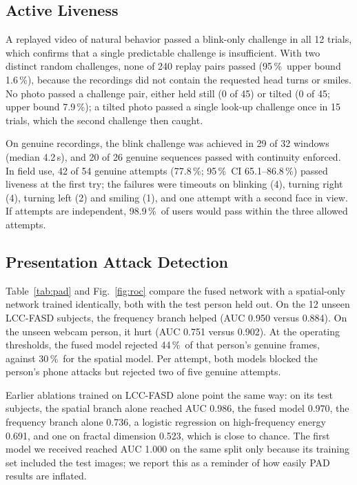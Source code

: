 \documentclass{ieeeaccess}
\newcommand{\pct}{\,\%}
\begin{document}
\subsection{Active Liveness}
\label{sec:res-liveness}
A replayed video of natural behavior passed a blink-only challenge in all 12 trials, which confirms that
a single predictable challenge is insufficient. With two distinct random challenges, none of 240 replay
pairs passed (95\pct\ upper bound 1.6\pct), because the recordings did not contain the requested head
turns or smiles. No photo passed a challenge pair, either held still (0 of 45) or tilted (0 of 45;
upper bound 7.9\pct); a tilted photo passed a single look-up challenge once in 15 trials, which the
second challenge then caught.

On genuine recordings, the blink challenge was achieved in 29 of 32 windows (median 4.2\,s), and 20 of
26 genuine sequences passed with continuity enforced. In field use, 42 of 54 genuine attempts (77.8\pct;
95\pct\ CI 65.1--86.8\pct) passed liveness at the first try; the failures were timeouts on blinking (4),
turning right (4), turning left (2) and smiling (1), and one attempt with a second face in view. If
attempts are independent, 98.9\pct\ of users would pass within the three allowed attempts.

\subsection{Presentation Attack Detection}
\label{sec:res-pad}
Table~\ref{tab:pad} and Fig.~\ref{fig:roc} compare the fused network with a spatial-only network
trained identically, both with the test person held out. On the 12 unseen LCC-FASD subjects, the
frequency branch helped (AUC 0.950 versus 0.884). On the unseen webcam person, it hurt (AUC 0.751
versus 0.902). At the operating thresholds, the fused model rejected 44\pct\ of that person's genuine
frames, against 30\pct\ for the spatial model. Per attempt, both models blocked the person's phone
attacks but rejected two of five genuine attempts.

Earlier ablations trained on LCC-FASD alone point the same way: on its test subjects, the spatial
branch alone reached AUC 0.986, the fused model 0.970, the frequency branch alone 0.736, a logistic
regression on high-frequency energy 0.691, and one on fractal dimension 0.523, which is close to
chance. The first model we received reached AUC 1.000 on the same split only because its training set
included the test images; we report this as a reminder of how easily PAD results are inflated.
\end{document}
